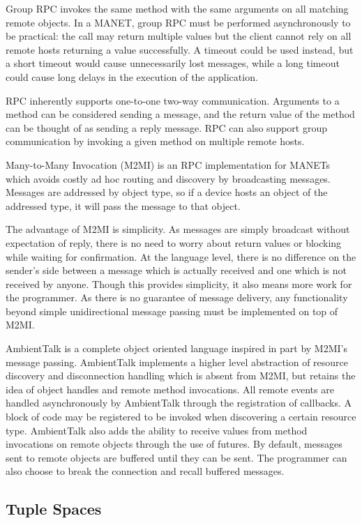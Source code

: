Group RPC invokes the same method with the same arguments on all matching remote objects. In a MANET, group RPC must be performed asynchronously to be practical: the call may return multiple values but the client cannot rely on all remote hosts returning a value successfully. A timeout could be used instead, but a short timeout would cause unnecessarily lost messages, while a long timeout could cause long delays in the execution of the application.

RPC inherently supports one-to-one two-way communication. Arguments to a method can be considered sending a message, and the return value of the method can be thought of as sending a reply message. RPC can also support group communication by invoking a given method on multiple remote hosts.

Many-to-Many Invocation (M2MI)\cite{m2mi} is an RPC implementation for MANETs which avoids costly ad hoc routing and discovery by broadcasting messages. Messages are addressed by object type, so if a device hosts an object of the addressed type, it will pass the message to that object.

The advantage of M2MI is simplicity. As messages are simply broadcast without expectation of reply, there is no need to worry about return values or blocking while waiting for confirmation. At the language level, there is no difference on the sender's side between a message which is actually received and one which is not received by anyone. Though this provides simplicity, it also means more work for the programmer. As there is no guarantee of message delivery, any functionality beyond simple unidirectional message passing must be implemented on top of M2MI.

AmbientTalk\cite{ambienttalk} is a complete object oriented language inspired in part by M2MI's message passing. AmbientTalk implements a higher level abstraction of resource discovery and disconnection handling which is absent from M2MI, but retains the idea of object handles and remote method invocations. All remote events are handled asynchronously by AmbientTalk through the registration of callbacks. A block of code may be registered to be invoked when discovering a certain resource type. AmbientTalk also adds the ability to receive values from method invocations on remote objects through the use of futures. By default, messages sent to remote objects are buffered until they can be sent. The programmer can also choose to break the connection and recall buffered messages.

\subsection{Tuple Spaces}\label{sec:tsparadigm}

